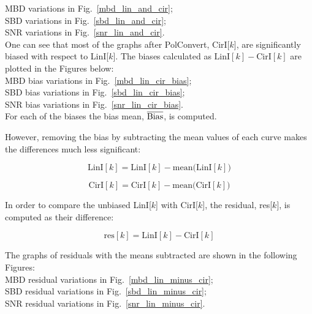 \documentclass[letterpaper,twoside,12pt]{article}
\begin{document}
\indent MBD variations in Fig.~\ref{mbd_lin_and_cir};  \\
\indent SBD variations in Fig.~\ref{sbd_lin_and_cir};  \\
\indent SNR variations in Fig.~\ref{snr_lin_and_cir}.  \\


One can see that most of the graphs after PolConvert, CirI[$k$], are significantly biased with respect to LinI[$k$]. The biases calculated as $\mathrm{LinI}[k] - \mathrm{CirI}[k]$ are plotted in the Figures below: \\

\indent MBD bias variations in Fig.~\ref{mbd_lin_cir_bias};  \\
\indent SBD bias variations in Fig.~\ref{sbd_lin_cir_bias};  \\
\indent SNR bias variations in Fig.~\ref{snr_lin_cir_bias}.  \\

For each of the biases the bias mean, $\overline{\rm Bias}$, is computed.

However, removing the bias by subtracting the mean values of each curve makes the differences much less significant:

\begin{equation}
  \label{subtr_mean_lin}
  \mathrm{LinI}[k] = \mathrm{LinI}[k] - \mathrm{mean(LinI}[k])
\end{equation}

\begin{equation}
  \label{subtr_mean_cir}
  \mathrm{CirI}[k] = \mathrm{CirI}[k] - \mathrm{mean(CirI}[k])
\end{equation}

\noindent In order to compare the unbiased LinI[$k$] with CirI[$k$], the residual, res[$k$], is computed as their difference:

\begin{equation}
  \label{resid}
  \mathrm{res}[k] = \mathrm{LinI}[k] - \mathrm{CirI}[k] 
\end{equation}

\noindent The graphs of residuals with the means subtracted are shown in the following Figures: \\

\indent MBD residual variations in Fig.~\ref{mbd_lin_minus_cir};  \\
\indent SBD residual variations in Fig.~\ref{sbd_lin_minus_cir};  \\
\indent SNR residual variations in Fig.~\ref{snr_lin_minus_cir}.  \\
\end{document}

